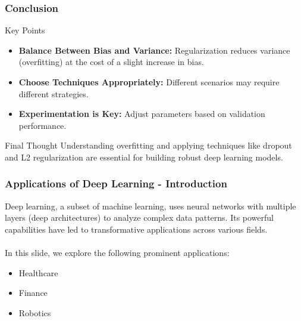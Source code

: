 \documentclass[aspectratio=169]{beamer}
\begin{document}
\begin{frame}[fragile]
    \frametitle{Conclusion}
    \begin{block}{Key Points}
        \begin{itemize}
            \item \textbf{Balance Between Bias and Variance:} Regularization reduces variance (overfitting) at the cost of a slight increase in bias.
            \item \textbf{Choose Techniques Appropriately:} Different scenarios may require different strategies.
            \item \textbf{Experimentation is Key:} Adjust parameters based on validation performance.
        \end{itemize}
    \end{block}
    \begin{block}{Final Thought}
        Understanding overfitting and applying techniques like dropout and L2 regularization are essential for building robust deep learning models.
    \end{block}
\end{frame}

\begin{frame}[fragile]
    \frametitle{Applications of Deep Learning - Introduction}
    Deep learning, a subset of machine learning, uses neural networks with multiple layers (deep architectures) to analyze complex data patterns. Its powerful capabilities have led to transformative applications across various fields. 
    \\ \\ 
    In this slide, we explore the following prominent applications:
    \begin{itemize}
        \item Healthcare
        \item Finance
        \item Robotics
    \end{itemize}
\end{frame}
\end{document}
